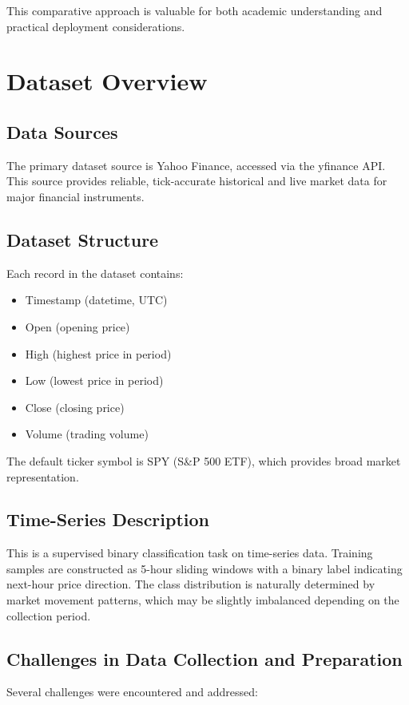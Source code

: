 \documentclass[conference]{IEEEtran}
\begin{document}
This comparative approach is valuable for both academic understanding and practical deployment considerations.

\section{Dataset Overview}

\subsection{Data Sources}
The primary dataset source is Yahoo Finance, accessed via the yfinance API. This source provides reliable, tick-accurate historical and live market data for major financial instruments.

\subsection{Dataset Structure}
Each record in the dataset contains:
\begin{itemize}
    \item Timestamp (datetime, UTC)
    \item Open (opening price)
    \item High (highest price in period)
    \item Low (lowest price in period)
    \item Close (closing price)
    \item Volume (trading volume)
\end{itemize}

The default ticker symbol is SPY (S\&P 500 ETF), which provides broad market representation.

\subsection{Time-Series Description}
This is a supervised binary classification task on time-series data. Training samples are constructed as 5-hour sliding windows with a binary label indicating next-hour price direction. The class distribution is naturally determined by market movement patterns, which may be slightly imbalanced depending on the collection period.

\subsection{Challenges in Data Collection and Preparation}

Several challenges were encountered and addressed:
\end{document}
